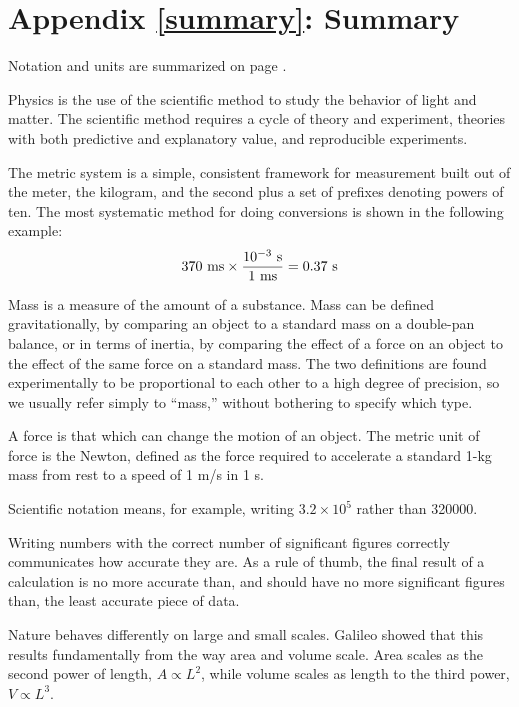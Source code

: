 \label{summary}%
\appendix\chapter{Appendix \ref{summary}: Summary}

Notation and units are summarized on page \pageref{notationtable}.

Physics is the use of the scientific method to study the
behavior of light and matter. The scientific method requires
a cycle of theory and experiment, theories with both
predictive and explanatory value, and reproducible experiments.

The metric system is a simple, consistent framework for
measurement built out of the meter, the kilogram, and the
second plus a set of prefixes denoting powers of ten. The
most systematic method for doing conversions is shown in
the following example:
\begin{equation*}
  370\ \zu{ms} \times \frac{10^{-3}\ \sunit}{1\ \zu{ms}} = 0.37\ \sunit
\end{equation*}

Mass is a measure of the amount of a substance. Mass can be
defined gravitationally, by comparing an object to a
standard mass on a double-pan balance, or in terms of
inertia, by comparing the effect of a force on an object to
the effect of the same force on a standard mass. The two
definitions are found experimentally to be proportional to
each other to a high degree of precision, so we usually
refer simply to ``mass,'' without bothering to specify which type.

A force is that which can change the motion of an object.
The metric unit of force is the Newton, defined as the force
required to accelerate a standard 1-kg mass from rest to a
speed of 1 m/s in 1 s.

Scientific notation means, for example, writing $3.2\times10^5$
 rather than 320000.

Writing numbers with the correct number of significant
figures correctly communicates how accurate they are. As a
rule of thumb, the final result of a calculation is no more
accurate than, and should have no more significant figures
than, the least accurate piece of data.

Nature behaves differently on large and small scales.
Galileo showed that this results fundamentally from the way
area and volume scale. Area scales as the second power of
length, $A\propto L^2$, while volume scales as length to the
third power, $V\propto L^3$.


